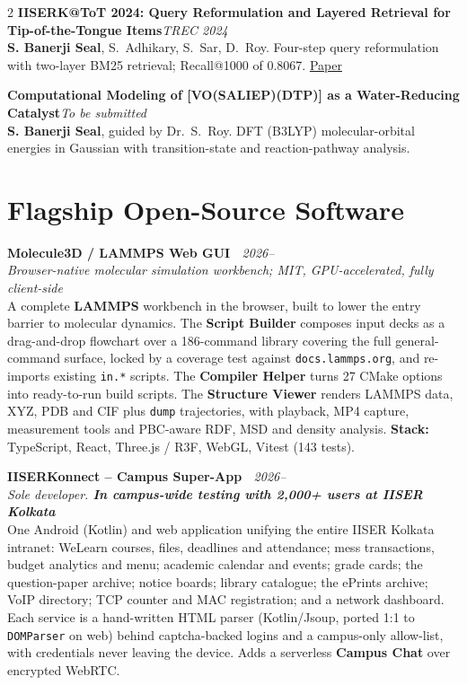 \documentclass[a4paper,10.5pt]{extarticle}
\newcommand{\entry}[3]{%
  {\normalsize\textbf{#1}}\hfill{\small\itshape\textcolor{mutedtext}{#2}}\\[0.04em]
  {\small #3}\par\vspace{3pt}%
}
\newcommand{\entryv}[4]{%
  {\normalsize\textbf{#1}}\hfill{\small\itshape\textcolor{mutedtext}{#2}}\\[0.04em]
  {\small\itshape\textcolor{mutedtext}{#3}}\\[0.04em]
  {\small #4}\par\vspace{3pt}%
}
\begin{document}
\begin{paracol}{2}
\entry{IISERK@ToT 2024: Query Reformulation and Layered Retrieval for Tip-of-the-Tongue Items}{TREC 2024}{%
\textbf{S. Banerji Seal}, S.~Adhikary, S.~Sar, D.~Roy. Four-step query reformulation with two-layer BM25 retrieval; Recall@1000 of 0.8067. \href{https://trec.nist.gov/pubs/trec33/papers/IISER-K.tot.pdf}{Paper}}

\entry{Computational Modeling of [VO(SALIEP)(DTP)] as a Water-Reducing Catalyst}{To be submitted}{%
\textbf{S. Banerji Seal}, guided by Dr.~S.~Roy. DFT (B3LYP) molecular-orbital energies in Gaussian with transition-state and reaction-pathway analysis.}

\switchcolumn

\section{Flagship Open-Source Software}

\entryv{Molecule3D / LAMMPS Web GUI \href{https://github.com/Shuvam-Banerji-Seal/lammps-web-gui}{\faGithub}~\href{https://shuvam-banerji-seal.github.io/lammps-web-gui/}{\faGlobe}}{2026--}{Browser-native molecular simulation workbench; MIT, GPU-accelerated, fully client-side}{%
A complete \textbf{LAMMPS} workbench in the browser, built to lower the entry barrier to molecular dynamics. The \textbf{Script Builder} composes input decks as a drag-and-drop flowchart over a 186-command library covering the full general-command surface, locked by a coverage test against \texttt{docs.lammps.org}, and re-imports existing \texttt{in.*} scripts. The \textbf{Compiler Helper} turns 27 CMake options into ready-to-run build scripts. The \textbf{Structure Viewer} renders LAMMPS data, XYZ, PDB and CIF plus \texttt{dump} trajectories, with playback, MP4 capture, measurement tools and PBC-aware RDF, MSD and density analysis. \textbf{Stack:} TypeScript, React, Three.js / R3F, WebGL, Vitest (143 tests).}

\entryv{IISERKonnect -- Campus Super-App \href{https://github.com/Shuvam-Banerji-Seal/iiserkonnect-website}{\faGithub}~\href{https://shuvam-banerji-seal.github.io/iiserkonnect-website/}{\faGlobe}}{2026--}{Sole developer. \textbf{In campus-wide testing with 2,000+ users at IISER Kolkata}}{%
One Android (Kotlin) and web application unifying the entire IISER Kolkata intranet: WeLearn courses, files, deadlines and attendance; mess transactions, budget analytics and menu; academic calendar and events; grade cards; the question-paper archive; notice boards; library catalogue; the ePrints archive; VoIP directory; TCP counter and MAC registration; and a network dashboard. Each service is a hand-written HTML parser (Kotlin/Jsoup, ported 1:1 to \texttt{DOMParser} on web) behind captcha-backed logins and a campus-only allow-list, with credentials never leaving the device. Adds a serverless \textbf{Campus Chat} over encrypted WebRTC.}


\end{paracol}
\end{document}
